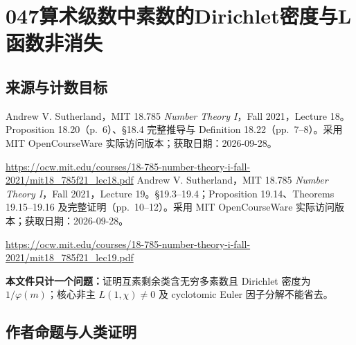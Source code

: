 \documentclass[UTF8,11pt]{ctexart}
\theoremstyle{definition}
\begin{document}
\section*{047\quad 算术级数中素数的Dirichlet密度与L函数非消失}
\subsection*{来源与计数目标}
Andrew V. Sutherland，MIT 18.785 \emph{Number Theory I}，Fall 2021，Lecture 18。Proposition 18.20（p.~6）、\S18.4 完整推导与 Definition 18.22（pp.~7--8）。采用 MIT OpenCourseWare 实际访问版本；获取日期：2026-09-28。
\par\url{https://ocw.mit.edu/courses/18-785-number-theory-i-fall-2021/mit18_785f21_lec18.pdf}
Andrew V. Sutherland，MIT 18.785 \emph{Number Theory I}，Fall 2021，Lecture 19。\S19.3--19.4；Proposition 19.14、Theorems 19.15--19.16 及完整证明（pp.~10--12）。采用 MIT OpenCourseWare 实际访问版本；获取日期：2026-09-28。
\par\url{https://ocw.mit.edu/courses/18-785-number-theory-i-fall-2021/mit18_785f21_lec19.pdf}
\par\textbf{本文件只计一个问题：}证明互素剩余类含无穷多素数且 Dirichlet 密度为 $1/\varphi(m)$；核心非主 $L(1,\chi)\ne0$ 及 cyclotomic Euler 因子分解不能省去。
\subsection*{作者命题与人类证明}
\end{document}
